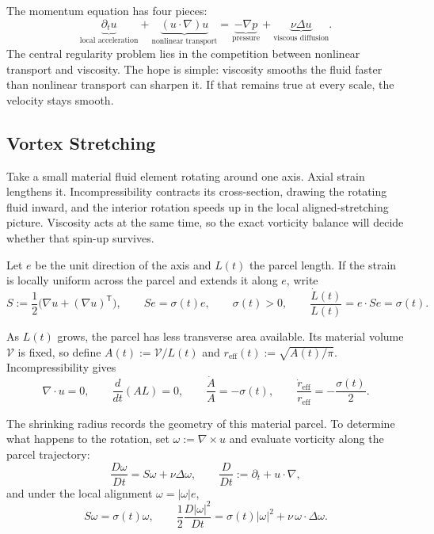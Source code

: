 
The momentum equation has four pieces:
\[
  \underbrace{\partial_t u}_{\text{local acceleration}}
  +
  \underbrace{(u\cdot\nabla)u}_{\text{nonlinear transport}}
  =
  \underbrace{-\nabla p}_{\text{pressure}}
  +
  \underbrace{\nu\Delta u}_{\text{viscous diffusion}}.
\]
The central regularity problem lies in the competition between nonlinear transport and viscosity.
The hope is simple: viscosity smooths the fluid faster than nonlinear transport can sharpen it.
If that remains true at every scale, the velocity stays smooth.

\subsection{Vortex Stretching}\label{sub:ThePerfectlyStretchingVortex}

Take a small material fluid element rotating around one axis. Axial strain lengthens it. Incompressibility contracts its cross-section, drawing the rotating fluid inward, and the interior rotation speeds up in the local aligned-stretching picture. Viscosity acts at the same time, so the exact vorticity balance will decide whether that spin-up survives.

Let \(e\) be the unit direction of the axis and \(L(t)\) the parcel length. If the strain is locally uniform across the parcel and extends it along \(e\), write
\[
  S:=\frac12\bigl(\nabla u+(\nabla u)^{\mathsf T}\bigr),
  \qquad
  Se=\sigma(t)e,
  \qquad
  \sigma(t)>0,
  \qquad
  \frac{\dot L(t)}{L(t)}
  =
  e\cdot Se
  =
  \sigma(t).
\]

As \(L(t)\) grows, the parcel has less transverse area available. Its material volume \(\mathcal V\) is fixed, so define \(A(t):=\mathcal V/L(t)\) and \(r_{\mathrm{eff}}(t):=\sqrt{A(t)/\pi}\). Incompressibility gives
\[
  \nabla\cdot u=0,
  \qquad
  \frac{d}{dt}(A L)=0,
  \qquad
  \frac{\dot A}{A}=-\sigma(t),
  \qquad
  \frac{\dot r_{\mathrm{eff}}}{r_{\mathrm{eff}}}
  =
  -\frac{\sigma(t)}{2}.
\]

The shrinking radius records the geometry of this material parcel. To determine what happens to the rotation, set \(\omega:=\nabla\times u\) and evaluate vorticity along the parcel trajectory:
\[
  \frac{D\omega}{Dt}
  =
  S\omega+\nu\Delta\omega,
  \qquad
  \frac{D}{Dt}
  :=
  \partial_t+u\cdot\nabla,
\]
and under the local alignment \(\omega=|\omega|e\),
\[
  S\omega
  =
  \sigma(t)\omega,
  \qquad
  \frac12\frac{D|\omega|^2}{Dt}
  =
  \sigma(t)|\omega|^2
  +
  \nu\,\omega\cdot\Delta\omega.
\]

